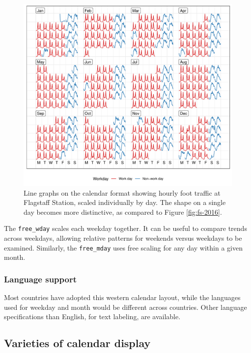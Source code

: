 \documentclass[12pt]{article}
\begin{document}
\begin{figure}

{\centering \includegraphics[width=\textwidth]{figure/fs-free-1} 

}

\caption{Line graphs on the calendar format showing hourly foot traffic at Flagstaff Station, scaled individually by day. The shape on a single day becomes more distinctive, as compared to Figure \ref{fig:fs-2016}.}\label{fig:fs-free}
\end{figure}



The \texttt{free\_wday} scales each weekday together. It can be useful to compare trends across weekdays, allowing relative patterns for weekends versus weekdays to be examined. Similarly, the \texttt{free\_mday} uses free scaling for any day within a given month.

\hypertarget{language-support}{%
\subsubsection{Language support}\label{language-support}}

Most countries have adopted this western calendar layout, while the languages used for weekday and month would be different across countries. Other language specifications than English, for text labeling, are available.

\hypertarget{sec:variations}{%
\subsection{Varieties of calendar display}\label{sec:variations}}
\end{document}
